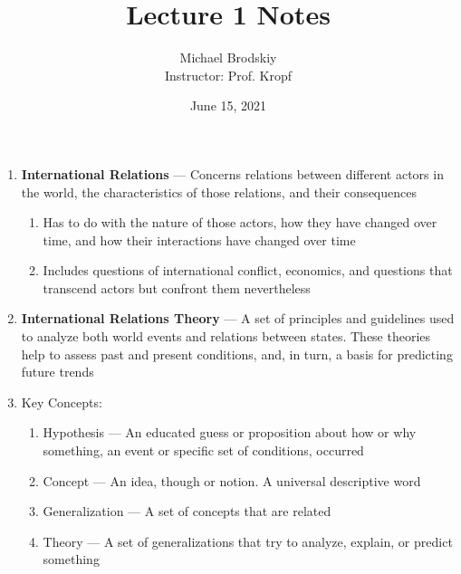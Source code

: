 \documentclass[12pt]{article}
\title{Lecture 1 Notes}
\date{June 15, 2021}
\author{Michael Brodskiy\\ \small Instructor: Prof. Kropf}
\begin{document}
    \maketitle

    \begin{enumerate}

      \item \textbf{International Relations} — Concerns relations between different actors in the world, the characteristics of those relations, and their consequences

        \begin{enumerate}

          \item Has to do with the nature of those actors, how they have changed over time, and how their interactions have changed over time

          \item Includes questions of international conflict, economics, and questions that transcend actors but confront them nevertheless

        \end{enumerate}

      \item \textbf{International Relations Theory} — A set of principles and guidelines used to analyze both world events and relations between states. These theories help to assess past and present conditions, and, in turn, a basis for predicting future trends

      \item Key Concepts:

        \begin{enumerate}

          \item Hypothesis — An educated guess or proposition about how or why something, an event or specific set of conditions, occurred

          \item Concept — An idea, though or notion. A universal descriptive word

          \item Generalization — A set of concepts that are related

          \item Theory — A set of generalizations that try to analyze, explain, or predict something

        \end{enumerate}


\end{enumerate}
\end{document}
